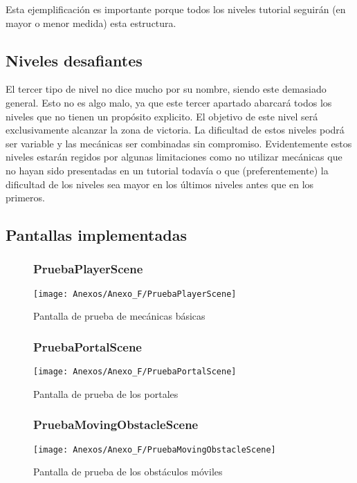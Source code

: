Esta ejemplificación es importante porque todos los niveles tutorial seguirán (en mayor o menor medida) esta estructura.

\subsection{Niveles desafiantes}
El tercer tipo de nivel no dice mucho por su nombre, siendo este demasiado general. Esto no es algo malo, ya que este tercer apartado abarcará todos los niveles que no tienen un propósito explicito. El objetivo de este nivel será exclusivamente alcanzar la zona de victoria. La dificultad de estos niveles podrá ser variable y las mecánicas ser combinadas sin compromiso. 
Evidentemente estos niveles estarán regidos por algunas limitaciones como no utilizar mecánicas que no hayan sido presentadas en un tutorial todavía o que (preferentemente) la dificultad de los niveles sea mayor en los últimos niveles antes que en los primeros.

\subsection{Pantallas implementadas}
\begin{figure}[h]
\subsubsection{PruebaPlayerScene}
\centering
\texttt{[image: Anexos/Anexo\_F/PruebaPlayerScene]}
\caption{Pantalla de prueba de mecánicas básicas }
\end{figure}

\begin{figure}[h]
\subsubsection{PruebaPortalScene}
\centering
\texttt{[image: Anexos/Anexo\_F/PruebaPortalScene]}
\caption{Pantalla de prueba de los portales }
\end{figure}

\begin{figure}[h]
\subsubsection{PruebaMovingObstacleScene}
\centering
\texttt{[image: Anexos/Anexo\_F/PruebaMovingObstacleScene]}
\caption{Pantalla de prueba de los obstáculos móviles }
\end{figure}

